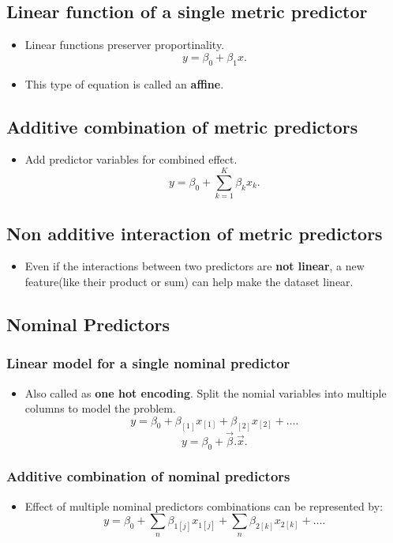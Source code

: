 \documentclass[a4paper]{article}
\begin{document}
\subsection{Linear function of a single metric predictor}
\begin{itemize}
    \item Linear functions preserver proportinality.
    \[
    y = \beta_0 + \beta_1x
    .\] 
    \item This type of equation is called an \textbf{affine}. 
\end{itemize}
\subsection{Additive combination of metric predictors}
\begin{itemize}
    \item Add predictor variables for combined effect. 
    \[
    y = \beta_0 + \sum_{k=1}^{K} \beta_kx_k
    .\] 
\end{itemize}
\subsection{Non additive interaction of metric predictors}
\begin{itemize}
    \item Even if the interactions between two predictors are \textbf{not linear}, a new feature(like their product or sum) can help make the dataset linear. 
\end{itemize}
\subsection{Nominal Predictors}
\subsubsection{Linear model for a single nominal predictor}
\begin{itemize}
    \item Also called as \textbf{one hot encoding}. Split the nomial variables into multiple columns to model the problem. 
    \[
        y = \beta_0 + \beta_{[1]}x_{[1]} + \beta_{[2]}x_{[2]} + \ldots  
    .\] 
    \[
        y = \beta_0 + \vec{\beta} . \vec{x} 
    .\] 
\end{itemize}
\subsubsection{Additive combination of nominal predictors}
\begin{itemize}
    \item Effect of multiple nominal predictors combinations can be represented by:
    \[
        y = \beta_0 + \sum_{n}\beta_{1[j]}x_{1[j]} + \sum_{n}\beta_{2[k]}x_{2[k]} + \ldots
    .\] 
\end{itemize}
\end{document}
